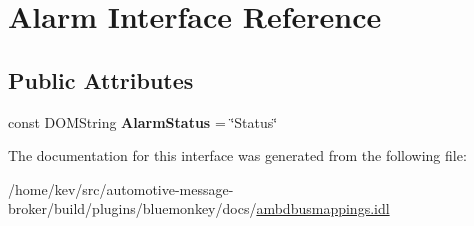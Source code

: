 \hypertarget{interfaceAlarm}{\section{Alarm Interface Reference}
\label{interfaceAlarm}
}
\subsection*{Public Attributes}
\begin{DoxyCompactItemize}
\item 
\hypertarget{interfaceAlarm_a0a8d6354cc6d4a3cbd926268ecce478e}{const D\+O\+M\+String {\bfseries Alarm\+Status} = \char`\"{}Status\char`\"{}}\label{interfaceAlarm_a0a8d6354cc6d4a3cbd926268ecce478e}

\end{DoxyCompactItemize}


The documentation for this interface was generated from the following file\+:\begin{DoxyCompactItemize}
\item 
/home/kev/src/automotive-\/message-\/broker/build/plugins/bluemonkey/docs/\hyperlink{ambdbusmappings_8idl}{ambdbusmappings.\+idl}\end{DoxyCompactItemize}
